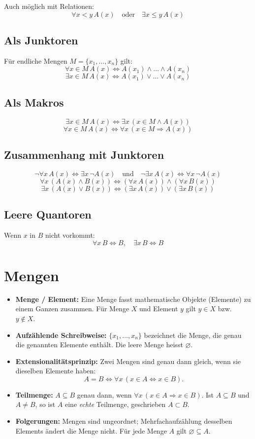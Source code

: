 \documentclass[10pt,landscape]{article}
\begin{document}
\begin{multicols*}{4}
Auch möglich mit Relationen:
$$\forall x < y\,A(x) \quad \text{oder} \quad \exists x \le y\,A(x)$$

\subsection{Als Junktoren}
Für endliche Mengen $M = \{x_1, \dots, x_n\}$ gilt:
$$\forall x \in M\,A(x) \Leftrightarrow A(x_1)\land \dots \land A(x_n)$$
$$\exists x \in M\,A(x) \Leftrightarrow A(x_1)\lor \dots \lor A(x_n)$$

\subsection{Als Makros}
$$\exists x \in M\,A(x) \Leftrightarrow \exists x\,(x \in M \land A(x))$$
$$\forall x \in M\,A(x) \Leftrightarrow \forall x\,(x \in M \Rightarrow A(x))$$

\subsection{Zusammenhang mit Junktoren}
$$\neg \forall x\,A(x) \Leftrightarrow \exists x\,\neg A(x)
\quad\text{und}\quad
\neg \exists x\,A(x) \Leftrightarrow \forall x\,\neg A(x)$$
$$\forall x\,(A(x)\land B(x)) \Leftrightarrow (\forall x\,A(x)) \land (\forall x\,B(x))$$
$$\exists x\,(A(x)\lor B(x)) \Leftrightarrow (\exists x\,A(x)) \lor (\exists x\,B(x))$$

\subsection{Leere Quantoren}
Wenn $x$ in $B$ nicht vorkommt:
$$\forall x\,B \Leftrightarrow B, \quad \exists x\,B \Leftrightarrow B$$

\section{Mengen}
\begin{itemize}
  \item \textbf{Menge / Element:} Eine Menge fasst mathematische Objekte (Elemente) zu einem Ganzen zusammen. Für Menge \(X\) und Element \(y\) gilt \(y\in X\) bzw.\ \(y\notin X\).
  \item \textbf{Aufzählende Schreibweise:} \(\{x_1,\dots,x_n\}\) bezeichnet die Menge, die genau die genannten Elemente enthält. Die leere Menge heisst \(\varnothing\).
  \item \textbf{Extensionalitätsprinzip:} Zwei Mengen sind genau dann gleich, wenn sie dieselben Elemente haben:
  \[ A=B \iff \forall x\,(x\in A \Leftrightarrow x\in B). \]
  \item \textbf{Teilmenge:} \(A\subseteq B\) genau dann, wenn \(\forall x\,(x\in A \Rightarrow x\in B)\). Ist \(A\subseteq B\) und \(A\neq B\), so ist \(A\) eine \emph{echte} Teilmenge, geschrieben \(A\subset B\).
  \item \textbf{Folgerungen:} Mengen sind ungeordnet; Mehrfachaufzählung desselben Elements ändert die Menge nicht. Für jede Menge \(A\) gilt \(\varnothing\subseteq A\).
\end{itemize}


\end{multicols*}
\end{document}
